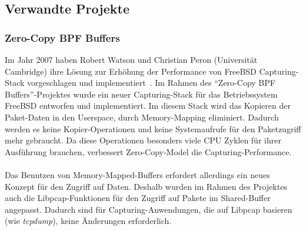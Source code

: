 \subsection{Verwandte Projekte}
\subsubsection*{Zero-Copy BPF Buffers}\label{sec:verw_bpf}
Im Jahr 2007 haben Robert Watson und Christian Peron (Universität Cambridge)
ihre Lösung zur Erhöhung  der Performance von FreeBSD Capturing-Stack
vorgeschlagen und implementiert~\cite{zerocopy}.  Im Rahmen des ``Zero-Copy BPF
Buffers''-Projektes wurde ein neuer Capturing-Stack für das Betriebssystem
FreeBSD entworfen und implementiert.  Im diesem Stack wird das Kopieren der
Paket-Daten in den Userspace, durch Memory-Mapping eliminiert. Dadurch  werden
es keine Kopier-Operationen und keine Systemaufrufe für den Paketzugriff mehr
gebraucht. Da diese Operationen besonders viele CPU Zyklen für ihrer Ausführung
brauchen, verbessert Zero-Copy-Model die Capturing-Performance.\\\\
%
Das Benutzen von Memory-Mapped-Buffers erfordert allerdings ein neues
Konzept für den Zugriff auf Daten. Deshalb wurden im Rahmen des Projektes auch
die Libpcap-Funktionen für den Zugriff auf Pakete im Shared-Buffer angepasst.
Dadurch sind für Capturing-Anwendungen, die auf Libpcap basieren (wie
\emph{tcpdump}), keine Änderungen erforderlich.


